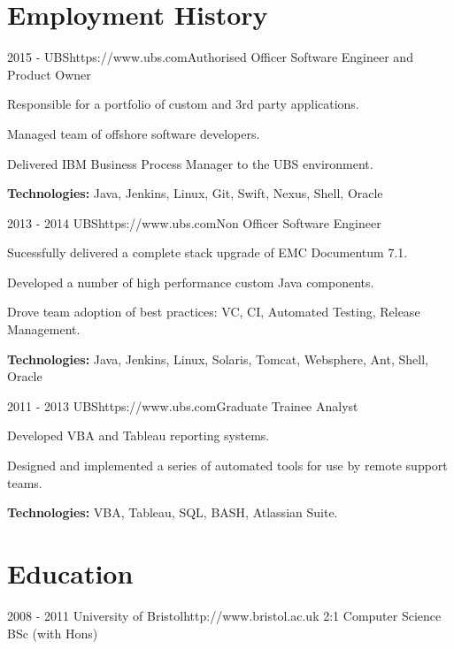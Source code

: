 \documentclass[10pt]{article} %
\begin{document}
\section{Employment History}

\job
{2015 -}
{UBS}{https://www.ubs.com}{Authorised Officer}
{Software Engineer and Product Owner}
{\begin{itemize-noindent}
\setlength\itemsep{-0.2em}
\item Responsible for a portfolio of custom and 3rd party applications.
\item Managed team of offshore software developers.
\item Delivered IBM Business Process Manager to the UBS environment.
\end{itemize-noindent}
\textbf{Technologies:} Java, Jenkins, Linux, Git, Swift, Nexus, Shell, Oracle}

\job
{2013 - 2014}
{UBS}{https://www.ubs.com}{Non Officer}
{Software Engineer}
{\begin{itemize-noindent}
\setlength\itemsep{-0.2em}
\item Sucessfully delivered a complete stack upgrade of EMC Documentum 7.1.
\item Developed a number of high performance custom Java components.
\item Drove team adoption of best practices: VC, CI, Automated Testing, Release Management.
\end{itemize-noindent}
\textbf{Technologies:} Java, Jenkins, Linux, Solaris, Tomcat, Websphere, Ant, Shell, Oracle}

\job
{2011 - 2013}
{UBS}{https://www.ubs.com}{Graduate Trainee}
{Analyst}
{\begin{itemize-noindent}
\setlength\itemsep{-0.2em}
\item Developed VBA and Tableau reporting systems.
\item Designed and implemented a series of automated tools for use by remote support teams.
\end{itemize-noindent}
\textbf{Technologies:} VBA, Tableau, SQL, BASH, Atlassian Suite.}


\section{Education}

\university
{2008 - 2011}
{University of Bristol}{http://www.bristol.ac.uk}
{2:1 Computer Science BSc (with Hons)}
\end{document}
